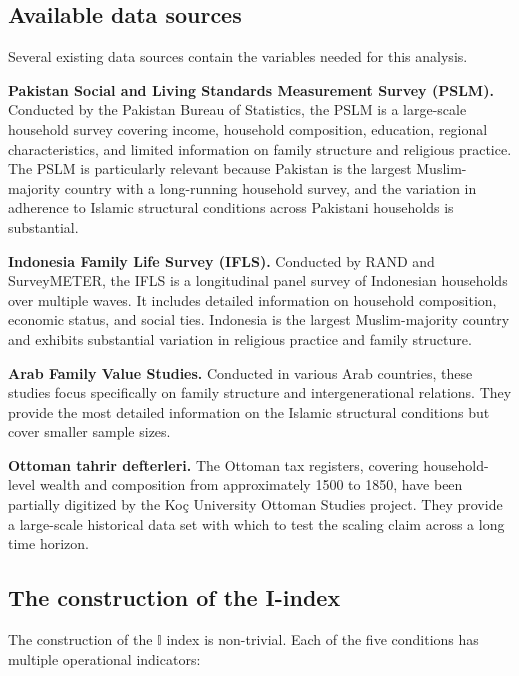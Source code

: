 \subsection{Available data sources}

Several existing data sources contain the variables needed for this
analysis.

\textbf{Pakistan Social and Living Standards Measurement Survey
(PSLM).} Conducted by the Pakistan Bureau of Statistics, the PSLM
is a large-scale household survey covering income, household
composition, education, regional characteristics, and limited
information on family structure and religious practice. The PSLM is
particularly relevant because Pakistan is the largest
Muslim-majority country with a long-running household survey, and
the variation in adherence to Islamic structural conditions across
Pakistani households is substantial.

\textbf{Indonesia Family Life Survey (IFLS).} Conducted by RAND and
SurveyMETER, the IFLS is a longitudinal panel survey of Indonesian
households over multiple waves. It includes detailed information on
household composition, economic status, and social ties. Indonesia
is the largest Muslim-majority country and exhibits substantial
variation in religious practice and family structure.

\textbf{Arab Family Value Studies.} Conducted in various Arab
countries, these studies focus specifically on family structure and
intergenerational relations. They provide the most detailed
information on the Islamic structural conditions but cover smaller
sample sizes.

\textbf{Ottoman tahrir defterleri.} The Ottoman tax registers,
covering household-level wealth and composition from approximately
1500 to 1850, have been partially digitized by the Ko\c{c} University
Ottoman Studies project. They provide a large-scale historical
data set with which to test the scaling claim across a long time
horizon.

\subsection{The construction of the I-index}

The construction of the $\mathbb{I}$ index is non-trivial. Each of
the five conditions has multiple operational indicators:

